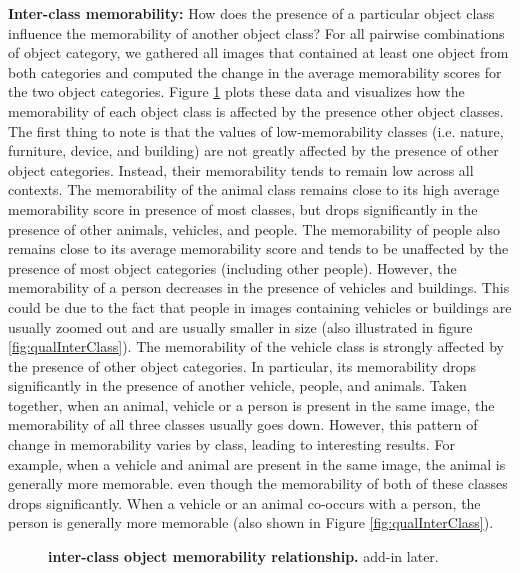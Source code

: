 \textbf{Inter-class memorability:} How does the presence of a particular object class influence the memorability of another object class? For all pairwise combinations of object category, we gathered all images that contained at least one object from both categories and computed the change in the average memorability scores for the two object categories. Figure \ref{fig:obLabelPair} plots these data and visualizes how the memorability of each object class is affected by the presence other object classes. The first thing to note is that the values of low-memorability classes (i.e. nature, furniture, device, and building) are not greatly affected by the presence of other object categories. Instead, their memorability tends to remain low across all contexts. The memorability of the animal class remains close to its high average memorability score in presence of most classes, but drops significantly in the presence of other animals, vehicles, and people. The memorability of people also remains close to its average memorability score and tends to be unaffected by the presence of most object categories (including other people). However, the memorability of a person decreases in the presence of vehicles and buildings. This could be due to the fact that people in images containing vehicles or buildings are usually zoomed out and are usually smaller in size (also illustrated in figure \ref{fig:qualInterClass}). The memorability of the vehicle class is strongly affected by the presence of other object categories. In particular, its memorability drops significantly in the presence of another vehicle, people, and animals. Taken together, when an animal, vehicle or a person is present in the same image, the memorability of all three classes usually goes down. However, this pattern of change in memorability varies by class, leading to interesting results. For example, when a vehicle and animal are present in the same image, the animal is generally more memorable. even though the memorability of both of these classes drops significantly. When a vehicle or an animal co-occurs with a person, the person is generally more memorable (also shown in Figure \ref{fig:qualInterClass}).

\begin{figure}[b]
\centering
{}
\vspace{-5mm}\caption{\footnotesize\textbf{inter-class object memorability relationship.} add-in later. }\label{fig:obLabelPair}
\end{figure}

